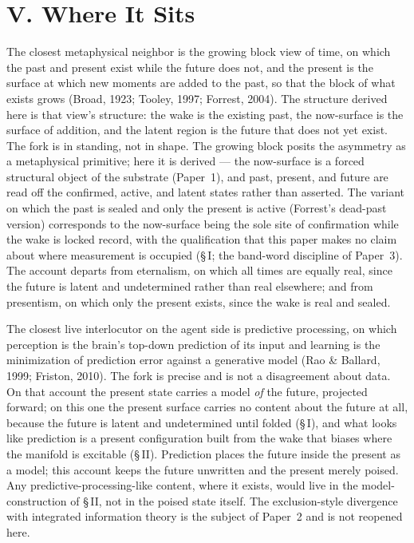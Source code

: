 \documentclass[11pt,oneside]{report}
\theoremstyle{definition}
\theoremstyle{remark}
\begin{document}
\section*{V. Where It Sits}

The closest metaphysical neighbor is the growing block view of time, on
which the past and present exist while the future does not, and the
present is the surface at which new moments are added to the past, so
that the block of what exists grows (Broad, 1923; Tooley, 1997; Forrest,
2004). The structure derived here is that view's structure: the wake is
the existing past, the now-surface is the surface of addition, and the
latent region is the future that does not yet exist. The fork is in
standing, not in shape. The growing block posits the asymmetry as a
metaphysical primitive; here it is derived --- the now-surface is a forced
structural object of the substrate (Paper~1), and past, present, and
future are read off the confirmed, active, and latent states rather than
asserted. The variant on which the past is sealed and only the present is
active (Forrest's dead-past version) corresponds to the now-surface being
the sole site of confirmation while the wake is locked record, with the
qualification that this paper makes no claim about where measurement is
occupied (\S\,I; the band-word discipline of Paper~3). The account departs
from eternalism, on which all times are equally real, since the future is
latent and undetermined rather than real elsewhere; and from presentism,
on which only the present exists, since the wake is real and sealed.

The closest live interlocutor on the agent side is predictive processing,
on which perception is the brain's top-down prediction of its input and
learning is the minimization of prediction error against a generative
model (Rao \& Ballard, 1999; Friston, 2010). The fork is precise and is
not a disagreement about data. On that account the present state carries a
model \emph{of} the future, projected forward; on this one the present
surface carries no content about the future at all, because the future is
latent and undetermined until folded (\S\,I), and what looks like
prediction is a present configuration built from the wake that biases
where the manifold is excitable (\S\,II). Prediction places the future
inside the present as a model; this account keeps the future unwritten and
the present merely poised. Any predictive-processing-like content, where
it exists, would live in the model-construction of \S\,II, not in the
poised state itself. The exclusion-style divergence with integrated
information theory is the subject of Paper~2 and is not reopened here.
\end{document}
